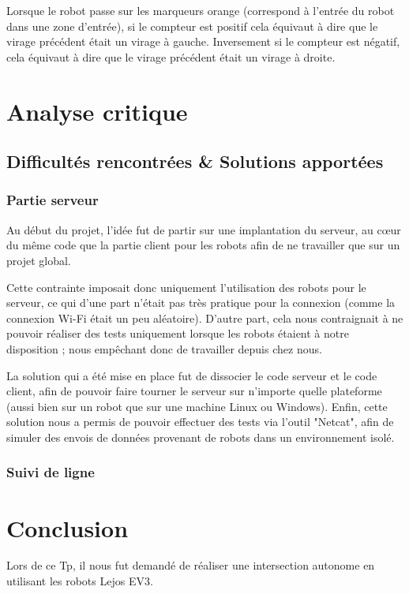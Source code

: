 \documentclass[french,a4paper,12pt]{report}
\begin{document}
Lorsque le robot passe sur les marqueurs orange (correspond à l’entrée du robot dans une zone d’entrée), si le compteur est positif cela équivaut à dire que le virage précédent était un virage à gauche. Inversement si le compteur est négatif, cela équivaut à dire que le virage précédent était un virage à droite.

\part{Analyse critique}

\chapter{Difficultés rencontrées \& Solutions apportées}

\section{Partie serveur}
Au début du projet, l’idée fut de partir sur une implantation du serveur, au cœur du même code que la partie client pour les robots afin de ne travailler que sur un projet global.

Cette contrainte imposait donc uniquement l’utilisation des robots pour le serveur, ce qui d’une part n’était pas très pratique pour la connexion (comme la connexion Wi-Fi était un peu aléatoire).
D’autre part, cela nous contraignait à ne pouvoir réaliser des tests uniquement lorsque les robots étaient à notre disposition ; nous empêchant donc de travailler depuis chez nous.

La solution qui a été mise en place fut de dissocier le code serveur et le code client, afin de pouvoir faire tourner le serveur sur n’importe quelle plateforme (aussi bien sur un robot que sur une machine Linux ou Windows).
Enfin, cette solution nous a permis de pouvoir effectuer des tests via l'outil "Netcat", afin de simuler des envois de données provenant de robots dans un environnement isolé.

\section{Suivi de ligne}


\part{Conclusion}
Lors de ce Tp, il nous fut demandé de réaliser une intersection autonome en utilisant les robots Lejos EV3.
\end{document}
